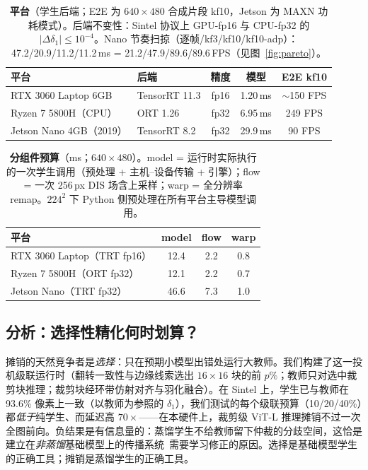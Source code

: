 \documentclass[10pt,twocolumn]{article}
\begin{document}
\begin{table}[t]
\centering\small
\caption{\textbf{平台}（学生后端；E2E 为 $640{\times}480$ 合成片段 kf10，Jetson 为 MAXN 功耗模式）。后端不变性：Sintel 协议上 GPU-fp16 与 CPU-fp32 的 $|\Delta\delta_1| \leq 10^{-4}$。Nano 节奏扫掠（逐帧/kf3/kf10/kf10-adp）：47.2/20.9/11.2/11.2\,ms = 21.2/47.9/89.6/89.6\,FPS（见图~\ref{fig:pareto}）。}
\label{tab:platform}
\begin{tabular}{llccc}
\toprule
平台 & 后端 & 精度 & 模型 & E2E kf10\\
\midrule
RTX 3060 Laptop 6GB & TensorRT 11.3 & fp16 & 1.20\,ms & $\sim$150 FPS\\
Ryzen 7 5800H（CPU） & ORT 1.26 & fp32 & 6.95\,ms & 249 FPS\\
Jetson Nano 4GB（2019） & TensorRT 8.2 & fp32 & 29.9\,ms & 90 FPS\\
\bottomrule
\end{tabular}
\end{table}

\begin{table}[t]
\centering\small
\caption{\textbf{分组件预算}（ms；$640{\times}480$）。model = 运行时实际执行的一次学生调用（预处理 + 主机--设备传输 + 引擎）；flow = 一次 256\,px DIS 场含上采样；warp = 全分辨率 remap。$224^2$ 下 Python 侧预处理在所有平台主导模型调用。}
\label{tab:components}
\begin{tabular}{lccc}
\toprule
平台 & model & flow & warp\\
\midrule
RTX 3060 Laptop（TRT fp16） & 12.4 & 2.2 & 0.8\\
Ryzen 7 5800H（ORT fp32） & 12.1 & 2.2 & 0.7\\
Jetson Nano（TRT fp32） & 46.6 & 7.3 & 1.0\\
\bottomrule
\end{tabular}
\end{table}

\subsection{分析：选择性精化何时划算？}
\label{sec:cascade}
摊销的天然竞争者是\emph{选择}：只在预期小模型出错处运行大教师。我们构建了这一投机级联运行时（翻转一致性与边缘线索选出 $16{\times}16$ 块的前 $p\%$；教师只对选中裁剪块推理；裁剪块经环带仿射对齐与羽化融合）。在 Sintel 上，学生已与教师在 93.6\% 像素上一致（以教师为参照的 $\delta_1$），我们测试的每个级联预算（10/20/40\%）都\emph{低于}纯学生、而延迟高 $70\times$——在本硬件上，裁剪级 ViT-L 推理摊销不过一次全图前向。负结果是有信息量的：蒸馏学生不给教师留下仲裁的分歧空间，这恰是建立在\emph{非蒸馏}基础模型上的传播系统~\cite{velodepth}需要学习修正的原因。选择是基础模型学生的正确工具；摊销是蒸馏学生的正确工具。
\end{document}
